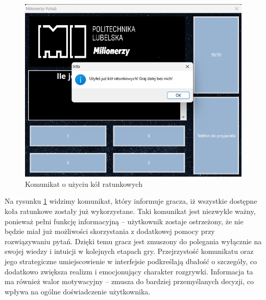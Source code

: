 \documentclass[]{article}
\begin{document}
	\begin{figure}[H]
		\centering
		\includegraphics[scale=0.3]{8.png}
		\caption{Komunikat o użyciu kół ratunkowych}
		\label{rys:7}
	\end{figure}
Na rysunku \ref{rys:7} widzimy komunikat, który informuje gracza, iż wszystkie dostępne koła ratunkowe zostały już wykorzystane. Taki komunikat jest niezwykle ważny, ponieważ pełni funkcję informacyjną – użytkownik zostaje ostrzeżony, że nie będzie miał już możliwości skorzystania z dodatkowej pomocy przy rozwiązywaniu pytań. Dzięki temu gracz jest zmuszony do polegania wyłącznie na swojej wiedzy i intuicji w kolejnych etapach gry. Przejrzystość komunikatu oraz jego strategiczne umiejscowienie w interfejsie podkreślają dbałość o szczegóły, co dodatkowo zwiększa realizm i emocjonujący charakter rozgrywki. Informacja ta ma również walor motywacyjny – zmusza do bardziej przemyślanych decyzji, co wpływa na ogólne doświadczenie użytkownika.
	
\end{document}

